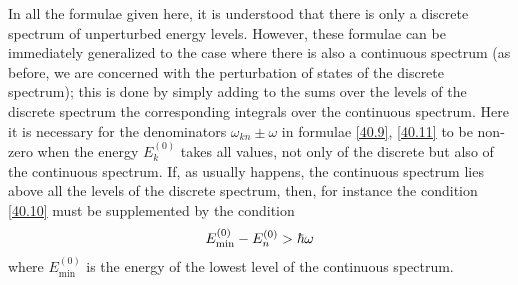 In all the formulae given here, it is understood that there is only a discrete spectrum of unperturbed energy levels. However, these formulae can be immediately generalized to the case where there is also a continuous spectrum (as before, we are concerned with the perturbation of states of the discrete spectrum); this is done by simply adding to the sums over the levels of the discrete spectrum the corresponding integrals over the continuous spectrum. Here it is necessary for the denominators $ \omega_{kn}\pm\omega $ in formulae \eqref{40.9}, \eqref{40.11} to be non-zero when the energy $ E_k^{(0)} $ takes all values, not only of the discrete but also of the continuous spectrum. If, as usually happens, the continuous spectrum lies above all the levels of the discrete spectrum, then, for instance the condition \eqref{40.10} must be supplemented by the condition
\begin{equation}\label{40.12}
E_{\mathrm{min}}^{(0)}-E_n^{(0)}>\hbar\omega
\end{equation}
where $ E_\mathrm{min}^{(0)} $ is the energy of the lowest level of the continuous spectrum.






